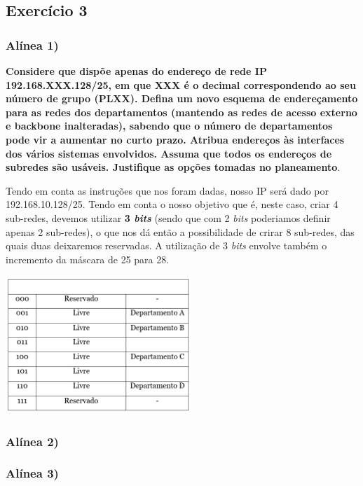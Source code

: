 \documentclass{article}
\begin{document}
\subsection{Exercício 3}
\subsubsection{Alínea 1)}
\textbf{Considere que dispõe apenas do endereço de rede IP 192.168.XXX.128/25, em que XXX é o decimal correspondendo ao
seu número de grupo (PLXX). Defina um novo esquema de endereçamento para as redes dos departamentos (mantendo
as redes de acesso externo e backbone inalteradas), sabendo que o número de departamentos pode vir a aumentar no
curto prazo. Atribua endereços às interfaces dos vários sistemas envolvidos. Assuma que todos os endereços de subredes são usáveis. Justifique as opções tomadas no planeamento}.\vspace{0.35cm}

\hspace{0.5cm}Tendo em conta as instruções que nos foram dadas, nosso IP será dado por 192.168.10.128/25. Tendo em conta o nosso objetivo que é, neste caso, criar 4 sub-redes, devemos utilizar \textbf{3 \textit{bits}} (sendo que com 2 \textit{bits} poderiamos definir apenas 2 sub-redes), o que nos dá então a possibilidade de crirar 8 sub-redes, das quais duas deixaremos reservadas. A utilização de 3 \textit{bits} envolve também o incremento da máscara de 25 para 28.

\begin{center}
    \includegraphics[width = 7cm]{3333.png}\par
\end{center}



\subsubsection{Alínea 2)}
\subsubsection{Alínea 3)}
\clearpage
\end{document}
